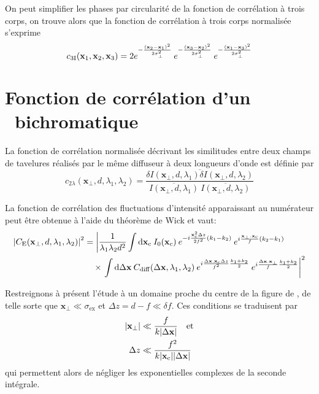 On peut simplifier les phases par circularité de la fonction de corrélation à trois corps, on trouve alors que la fonction de corrélation à trois corps normalisée s'exprime
\begin{equation}
c_{\mathrm{3I}}(\mathbf{x}_1,\mathbf{x}_2,\mathbf{x}_3)=2 e^{-\frac{(\mathbf{x}_2-\mathbf{x}_1)^2}{2\sigma_{\perp}^2}} \: e^{-\frac{(\mathbf{x}_3-\mathbf{x}_2)^2}{2\sigma_{\perp}^2}} \: e^{-\frac{(\mathbf{x}_1-\mathbf{x}_3)^2}{2\sigma_{\perp}^2}}
\end{equation}

\section{Fonction de corrélation d'un \speckle\ bichromatique}
La fonction de corrélation normalisée décrivant les similitudes entre deux champs de tavelures réalisés par le même diffuseur à deux longueurs d'onde est définie par
\begin{equation}
c_{2\lambda}(\mathbf{x}_{\perp},d,\lambda_1, \lambda_2)=\frac{\overline{\delta I (\mathbf{x}_{\perp},d,\lambda_1) \delta I (\mathbf{x}_{\perp},d,\lambda_2)}}{\overline{I(\mathbf{x}_{\perp},d,\lambda_1)}\:\overline{I(\mathbf{x}_{\perp},d,\lambda_2)}}
\end{equation}

La fonction de corrélation des fluctuations d'intensité apparaissant au numérateur peut être obtenue à l'aide du théorème de Wick et vaut:
\begin{align}
\left| C_{\mathrm{E}}(\mathbf{x}_{\perp},d,\lambda_1,\lambda_2) \right|^2 &= \left| \frac{1}{\lambda_1\lambda_2 d^2} \int{\mathop{}\mathopen{}\mathrm{d}\mathbf{x}_{\mathrm{c}}\: I_0(\mathbf{x}_{\mathrm{c}}) \: e^{-i\frac{\mathbf{x}_{\mathrm{c}}^2 \Delta z}{2f^2}(k_1-k_2)} \: e^{i \frac{\mathbf{x}_{\perp}.\mathbf{x}_{\mathrm{c}}}{f}(k_2-k_1)}}\right. \\
&\nonumber \quad\times \left. \int{\mathop{}\mathopen{}\mathrm{d}\Delta\mathbf{x}\: C_{\mathrm{diff}}(\Delta\mathbf{x}, \lambda_1, \lambda_2)\: e^{i \frac{\Delta\mathbf{x}.\mathbf{x}_{\mathrm{c}}\Delta z}{f^2}\frac{k_1+k_2}{2}} \: e^{i\frac{\Delta\mathbf{x}.\mathbf{x}_{\perp}}{f}\frac{k_1+k_2}{2}}}\right|^2
\end{align}

Restreignons à présent l'étude à un domaine proche du centre de la figure de \speckle , de telle sorte que $\mathbf{x}_{\perp}\ll\sigma_{\mathrm{ex}}$ et $\Delta z=d-f \ll \delta f$. Ces conditions se traduisent par 
\begin{align}
|\mathbf{x}_{\perp}| &\ll \frac{f}{k |\Delta\mathbf{x}|}  \quad\text{et}\\
\Delta z &\ll \frac{f^2}{k|\mathbf{x}_{\mathrm{c}}||\Delta\mathbf{x}|}
\end{align}
qui permettent alors de négliger les exponentielles complexes de la seconde intégrale.

